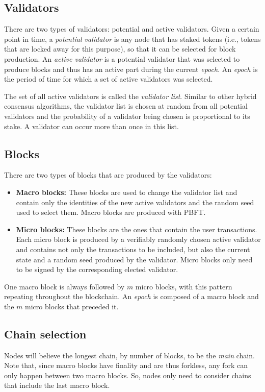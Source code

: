 \documentclass[conference]{IEEEtran}
\begin{document}
\subsection{Validators}
There are two types of validators: potential and active validators. Given a certain point in time, a \textit{potential validator} is any node that has staked tokens (i.e., tokens that are locked away for this purpose), so that it can be selected for block production. An \textit{active validator} is a potential validator that was selected to produce blocks and thus has an active part during the current \textit{epoch}. An \textit{epoch} is the period of time for which a set of active validators was selected.

The set of all active validators is called the \textit{validator list}. Similar to other hybrid consensus algorithms, the validator list is chosen at random from all potential validators and the probability of a validator being chosen is proportional to its stake. A validator can occur more than once in this list.

\subsection{Blocks}
There are two types of blocks that are produced by the validators:

\begin{itemize}
	\item \textbf{Macro blocks:} These blocks are used to change the validator list and contain only the identities of the new active validators and the random seed used to select them. Macro blocks are produced with PBFT.
	\item \textbf{Micro blocks:} These blocks are the ones that contain the user transactions. Each micro block is produced by a verifiably randomly chosen active validator and contains not only the transactions to be included, but also the current state and a random seed produced by the validator. Micro blocks only need to be signed by the corresponding elected validator.
\end{itemize}

One macro block is always followed by $m$ micro blocks, with this pattern repeating throughout the blockchain. An \textit{epoch} is composed of a macro block and the $m$ micro blocks that preceded it.

\subsection{Chain selection}
Nodes will believe the longest chain, by number of blocks, to be the \textit{main} chain. Note that, since macro blocks have finality and are thus forkless, any fork can only happen between two macro blocks. So, nodes only need to consider chains that include the last macro block.
\end{document}
